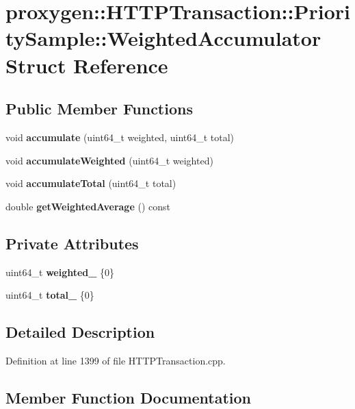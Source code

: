 \section{proxygen\+:\+:H\+T\+T\+P\+Transaction\+:\+:Priority\+Sample\+:\+:Weighted\+Accumulator Struct Reference}
\label{structproxygen_1_1HTTPTransaction_1_1PrioritySample_1_1WeightedAccumulator}
\subsection*{Public Member Functions}
\begin{DoxyCompactItemize}
\item 
void {\bf accumulate} (uint64\+\_\+t weighted, uint64\+\_\+t total)
\item 
void {\bf accumulate\+Weighted} (uint64\+\_\+t weighted)
\item 
void {\bf accumulate\+Total} (uint64\+\_\+t total)
\item 
double {\bf get\+Weighted\+Average} () const 
\end{DoxyCompactItemize}
\subsection*{Private Attributes}
\begin{DoxyCompactItemize}
\item 
uint64\+\_\+t {\bf weighted\+\_\+} \{0\}
\item 
uint64\+\_\+t {\bf total\+\_\+} \{0\}
\end{DoxyCompactItemize}


\subsection{Detailed Description}


Definition at line 1399 of file H\+T\+T\+P\+Transaction.\+cpp.



\subsection{Member Function Documentation}
